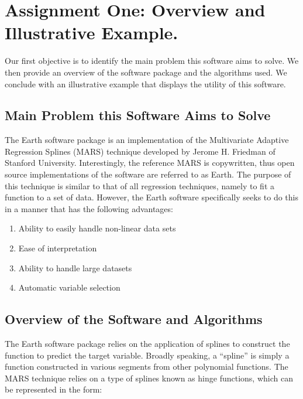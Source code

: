 

\graphicspath{{C:/Documents and Settings/amcelhinney/My Documents/GitHub/MCS507ProjectTwo/tex/include/}}

\section{Assignment One: Overview and Illustrative Example.} %
\label{sec: Main Problem}
Our first objective is to identify the main problem this software aims to solve. We then provide an overview of the software package and the algorithms used. We conclude with an illustrative example that displays the utility of this software.

\subsection{Main Problem this Software Aims to Solve} %
\label{sub:methoda}
The Earth software package is an implementation of the Multivariate Adaptive Regression Splines (MARS) technique developed by Jerome H. Friedman of Stanford University. Interestingly, the reference MARS is copywritten, thus open source implementations of the software are referred to as Earth. The purpose of this technique is similar to that of all regression techniques, namely to fit a function to a set of data. However, the Earth software specifically seeks to do this in a manner that has the following advantages:
\begin{enumerate}
\item Ability to easily handle non-linear data sets
\item Ease of interpretation 
\item Ability to handle large datasets
\item Automatic variable selection
\end{enumerate}



\subsection{Overview of the Software and Algorithms} %
The Earth software package relies on the application of splines to construct the function to predict the target variable. Broadly speaking, a “spline” is simply a function constructed in various segments from other polynomial functions. The MARS technique relies on a type of splines known as hinge functions, which can be represented in the form:  

